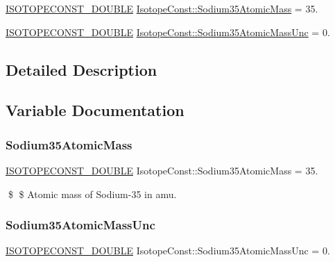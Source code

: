 \begin{DoxyCompactItemize}
\item 
\mbox{\hyperlink{group___isotope_const-_macros_ga8f45a7272ce02c0b4c65c44636ed719a}{I\+S\+O\+T\+O\+P\+E\+C\+O\+N\+S\+T\+\_\+\+D\+O\+U\+B\+LE}} \mbox{\hyperlink{group___isotope_const-_sodium-_na35_gaec71a1022dce6ba93f27446dfae3cd83}{Isotope\+Const\+::\+Sodium35\+Atomic\+Mass}} = 35.
\item 
\mbox{\hyperlink{group___isotope_const-_macros_ga8f45a7272ce02c0b4c65c44636ed719a}{I\+S\+O\+T\+O\+P\+E\+C\+O\+N\+S\+T\+\_\+\+D\+O\+U\+B\+LE}} \mbox{\hyperlink{group___isotope_const-_sodium-_na35_ga344e7149322e5fbfc3b7b3bb6edaa5a9}{Isotope\+Const\+::\+Sodium35\+Atomic\+Mass\+Unc}} = 0.
\end{DoxyCompactItemize}


\subsection{Detailed Description}


\subsection{Variable Documentation}
\mbox{\label{group___isotope_const-_sodium-_na35_gaec71a1022dce6ba93f27446dfae3cd83}} 
\subsubsection{\texorpdfstring{Sodium35\+Atomic\+Mass}{Sodium35AtomicMass}}
{\footnotesize\ttfamily \mbox{\hyperlink{group___isotope_const-_macros_ga8f45a7272ce02c0b4c65c44636ed719a}{I\+S\+O\+T\+O\+P\+E\+C\+O\+N\+S\+T\+\_\+\+D\+O\+U\+B\+LE}} Isotope\+Const\+::\+Sodium35\+Atomic\+Mass = 35.}

\$ \$ Atomic mass of Sodium-\/35 in amu. \mbox{\label{group___isotope_const-_sodium-_na35_ga344e7149322e5fbfc3b7b3bb6edaa5a9}} 
\subsubsection{\texorpdfstring{Sodium35\+Atomic\+Mass\+Unc}{Sodium35AtomicMassUnc}}
{\footnotesize\ttfamily \mbox{\hyperlink{group___isotope_const-_macros_ga8f45a7272ce02c0b4c65c44636ed719a}{I\+S\+O\+T\+O\+P\+E\+C\+O\+N\+S\+T\+\_\+\+D\+O\+U\+B\+LE}} Isotope\+Const\+::\+Sodium35\+Atomic\+Mass\+Unc = 0.}

